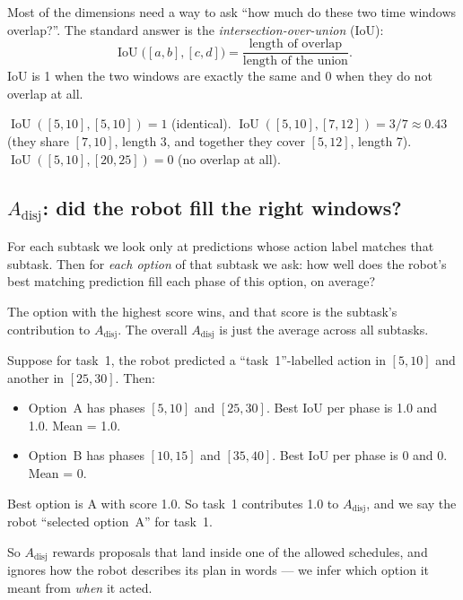 \documentclass[11pt]{article}
\newcommand{\Adisj}{A_{\text{disj}}}
\newcommand{\IoU}{\operatorname{IoU}}
\begin{document}
Most of the dimensions need a way to ask ``how much do these two time
windows overlap?''. The standard answer is the
\emph{intersection-over-union} (IoU):
\begin{equation*}
  \IoU\!\bigl([a,b], [c,d]\bigr) =
  \frac{\text{length of overlap}}{\text{length of the union}}.
\end{equation*}
IoU is 1 when the two windows are exactly the same and 0 when they
do not overlap at all.

\begin{example}
$\IoU([5,10], [5,10]) = 1$ (identical).
$\IoU([5,10], [7,12]) = 3/7 \approx 0.43$ (they share $[7,10]$, length
3, and together they cover $[5,12]$, length 7).
$\IoU([5,10], [20,25]) = 0$ (no overlap at all).
\end{example}

\subsection{$\Adisj$: did the robot fill the right windows?}
\label{sec:adisj}

For each subtask we look only at predictions whose action label
matches that subtask. Then for \emph{each option} of that subtask we
ask: how well does the robot's best matching prediction fill each
phase of this option, on average?

The option with the highest score wins, and that score is the
subtask's contribution to $\Adisj$. The overall $\Adisj$ is just the
average across all subtasks.

\begin{example}
Suppose for task~1, the robot predicted a ``task~1''-labelled action
in $[5,10]$ and another in $[25,30]$. Then:
\begin{itemize}
  \item Option~A has phases $[5,10]$ and $[25,30]$. Best IoU per phase
    is 1.0 and 1.0. Mean = 1.0.
  \item Option~B has phases $[10,15]$ and $[35,40]$. Best IoU per
    phase is 0 and 0. Mean = 0.
\end{itemize}
Best option is A with score 1.0. So task~1 contributes 1.0 to
$\Adisj$, and we say the robot ``selected option~A'' for task~1.
\end{example}

So $\Adisj$ rewards proposals that land inside one of the allowed
schedules, and ignores how the robot describes its plan in words --- we
infer which option it meant from \emph{when} it acted.
\end{document}
